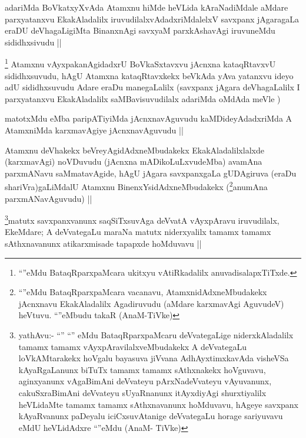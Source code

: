 \begin{artha}
adariMda BoVkatxyXvAda Atamxnu hiMde heVLida kAraNadiMdale aMdare parxyatanxvu EkakAladalilx iruvudilalxvAdadxriMdalelxV savxpanx jAgaragaLa eraDU deVhagaLigiMta BinanxnAgi savxyaM parxkAshavAgi iruvuneMdu sididhxsivudu ||
\end{artha}


\begin{artha}
\footnote{``\stext''eMdu BataqRparxpaMcara ukitxyu vAtiRkadalilx anuvadisalapxTiTxde.}
Atamxnu vAyxpakanAgidadxrU BoVkaSxtavxvu jAcnxna kataqRtavxvU sididhxsuvudu, hAgU Atamxna kataqRtavxkekx beVkAda yAva yatanxvu ideyo adU sididhxsuvudu Adare eraDu manegaLalilx (savxpanx jAgara deVhagaLalilx I parxyatanxvu EkakAladalilx saMBavisuvudilalx adariMda oMdAda meVle )
\end{artha}

\begin{artha}
matotxMdu eMba paripATiyiMda jAcnxnavAguvudu kaMDideyAdadxriMda A AtamxniMda karxmavAgiye jAcnxnavAguvudu ||
\end{artha}

\begin{artha}
Atamxnu deVhakekx beVreyAgidAdxneMbudakekx EkakAladalilxlalxde (karxmavAgi) noVDuvudu (jAcnxna mADikoLuLxvudeMba) avamAna parxmANavu saMmatavAgide, hAgU jAgara savxpanxgaLa gUDAgiruva (eraDu shariVra)gaLiMdalU Atamxnu BinenxYsidAdxneMbudakekx (\footnote{``\stext''eMdu BataqRparxpaMcara vacanavu, AtamxnidAdxneMbudakekx jAcnxnavu EkakAladalilx Agadiruvudu (aMdare karxmavAgi AguvudeV) heVtuvu. ``\stext''eMbudu takaR (AnaM-TiVke)}anumAna parxmANavAguvudu) ||
\end{artha}

\begin{artha}
\footnote{yathAvu:- ``\stext'' ``\stext'' eMdu BataqRparxpaMcaru deVvategaLige niderxkAladalilx tamamx tamamx vAyxpAravilalxveMbudakekx A deVvategaLu loVkAMtarakekx hoVgalu bayasuva jiVvana AdhAyxtimxkavAda visheVSa kAyaRgaLanunx biTuTx tamamx tamamx sAthxnakekx hoVguvavu, aginxyanunx vAgaBimAni deVvateyu pArxNadeVvateyu vAyuvanunx, cakuSxraBimAni deVvateyu sUyaRnanunx itAyxdiyAgi shurxtiyalilx heVLidaMte tamamx tamamx sAthxnavanunx hoMduvavu, hAgeye savxpanx kAyaRvanunx paDeyalu iciCxsuvAtanige deVvategaLu horage sariyuvavu eMdU heVLidAdxre ``\stext''eMdu (AnaM- TiVke)}matutx savxpanxvanunx saqSiTxsuvAga deVvatA vAyxpAravu iruvudilalx, EkeMdare; A deVvategaLu maraNa matutx niderxyalilx tamamx tamamx sAthxnavanunx atikarxmisade tapapxde hoMduvavu ||
\end{artha}

